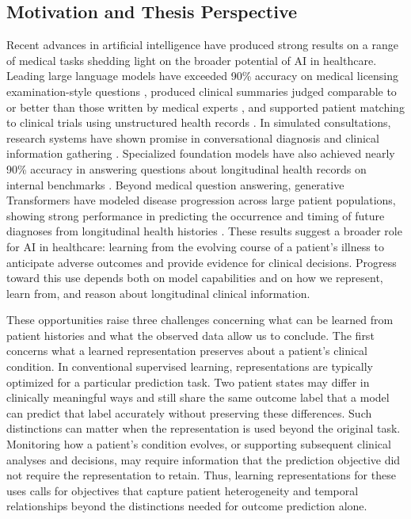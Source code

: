 \subsection{Motivation and Thesis Perspective}
\label{ch01:sec:thesis-perspective}

Recent advances in artificial intelligence have produced strong results on a range of medical tasks shedding light on the broader potential of AI in healthcare.
Leading large language models have exceeded 90\% accuracy on medical licensing examination-style questions \citep{vishwanath2026generalpurpose}, produced clinical summaries judged comparable to or better than those written by medical experts \citep{van2024adapted}, and supported patient matching to clinical trials using unstructured health records \citep{callies2025realworld}.
In simulated consultations, research systems have shown promise in conversational diagnosis and clinical information gathering \citep{saab2026advancing}.
Specialized foundation models have also achieved nearly 90\% accuracy in answering questions about longitudinal health records on internal benchmarks \citep{sellergren2026medgemmatechnicalreport}.
Beyond medical question answering, generative Transformers have modeled disease progression across large patient populations, showing strong performance in predicting the occurrence and timing of future diagnoses from longitudinal health histories \citep{shmatko2025learning}.
These results suggest a broader role for AI in healthcare: learning from the evolving course of a patient's illness to anticipate adverse outcomes and provide evidence for clinical decisions.
Progress toward this use depends both on model capabilities and on how we represent, learn from, and reason about longitudinal clinical information.

These opportunities raise three challenges concerning what can be learned from patient histories and what the observed data allow us to conclude.
The first concerns what a learned representation preserves about a patient's clinical condition.
In conventional supervised learning, representations are typically optimized for a particular prediction task.
Two patient states may differ in clinically meaningful ways and still share the same outcome label that a model can predict that label accurately without preserving these differences.
Such distinctions can matter when the representation is used beyond the original task.
Monitoring how a patient's condition evolves, or supporting subsequent clinical analyses and decisions, may require information that the prediction objective did not require the representation to retain.
Thus, learning representations for these uses calls for objectives that capture patient heterogeneity and temporal relationships beyond the distinctions needed for outcome prediction alone.


